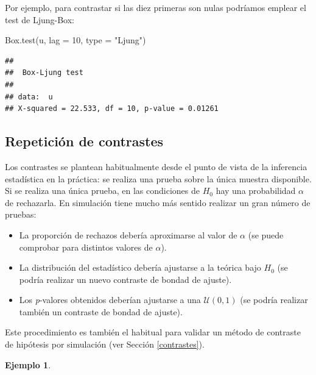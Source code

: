 \documentclass[
]{book}
\newenvironment{Shaded}{\begin{snugshade}}{\end{snugshade}}
\newcommand{\AttributeTok}[1]{\textcolor[rgb]{0.77,0.63,0.00}{#1}}
\newcommand{\DecValTok}[1]{\textcolor[rgb]{0.00,0.00,0.81}{#1}}
\newcommand{\FunctionTok}[1]{\textcolor[rgb]{0.00,0.00,0.00}{#1}}
\newcommand{\NormalTok}[1]{#1}
\newcommand{\StringTok}[1]{\textcolor[rgb]{0.31,0.60,0.02}{#1}}
\theoremstyle{break}
\theoremstyle{definition}
\theoremstyle{definition}
\newtheorem{example}{Ejemplo}[chapter]
\theoremstyle{definition}
\theoremstyle{definition}
\theoremstyle{remark}
\begin{document}
Por ejemplo, para contrastar si las diez primeras son nulas podríamos emplear el test de Ljung-Box:

\begin{Shaded}
\begin{Highlighting}[]
\FunctionTok{Box.test}\NormalTok{(u, }\AttributeTok{lag =} \DecValTok{10}\NormalTok{, }\AttributeTok{type =} \StringTok{"Ljung"}\NormalTok{)}
\end{Highlighting}
\end{Shaded}

\begin{verbatim}
## 
##  Box-Ljung test
## 
## data:  u
## X-squared = 22.533, df = 10, p-value = 0.01261
\end{verbatim}

\hypertarget{repeticiuxf3n-de-contrastes}{%
\subsection{Repetición de contrastes}\label{repeticiuxf3n-de-contrastes}}

Los contrastes se plantean habitualmente desde el punto de vista de la inferencia estadística en la práctica: se realiza una prueba sobre la única muestra disponible.
Si se realiza una única prueba, en las condiciones de \(H_0\) hay una probabilidad \(\alpha\) de rechazarla.
En simulación tiene mucho más sentido realizar un gran número de pruebas:

\begin{itemize}
\item
  La proporción de rechazos debería aproximarse al valor de
  \(\alpha\) (se puede comprobar para distintos valores de \(\alpha\)).
\item
  La distribución del estadístico debería ajustarse a la teórica
  bajo \(H_0\) (se podría realizar un nuevo contraste de bondad
  de ajuste).
\item
  Los \emph{p}-valores obtenidos deberían ajustarse a una
  \(\mathcal{U}\left(0,1\right)\) (se podría realizar también un
  contraste de bondad de ajuste).
\end{itemize}

Este procedimiento es también el habitual para validar un método de
contraste de hipótesis por simulación (ver Sección \ref{contrastes}).

\begin{example}
\protect\hypertarget{exm:rep-test-randu}{}{\label{exm:rep-test-randu} }
\end{example}
\end{document}

